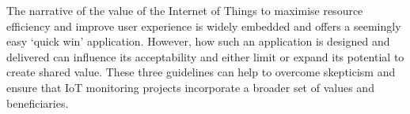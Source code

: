 The narrative of the value of the Internet of Things to maximise resource efficiency and improve user experience is widely embedded and offers a seemingly easy ‘quick win’ application. However, how such an application is designed and delivered can influence its acceptability and either limit or expand its potential to create shared value. These three guidelines can help to overcome skepticism and ensure that IoT monitoring projects incorporate a broader set of values and beneficiaries.
